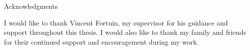 \thispagestyle{empty}

\vspace*{20mm}

\begin{center}
    { Acknowledgments}
\end{center}

\vspace{10mm}

I would like to thank Vincent Fortuin, my supervisor for his guidance and support throughout this thesis. I would also like to thank my 
family and friends for their continued support and encouragement during my work.

\cleardoublepage{}
